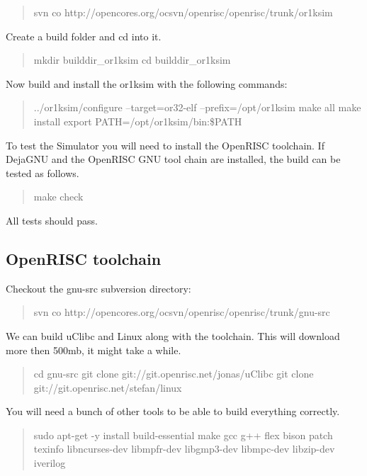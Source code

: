 \documentclass[10pt,a4paper]{article}
\begin{document}
\begin{quote}
svn co http://opencores.org/ocsvn/openrisc/openrisc/trunk/or1ksim
\end{quote}

Create a build folder and cd into it.
\begin{quote}
mkdir builddir\_or1ksim \newline
cd builddir\_or1ksim
\end{quote}

Now build and install the or1ksim with the following commands:
\begin{quote}
../or1ksim/configure --target=or32-elf --prefix=/opt/or1ksim \newline 
make all  \newline
make install \newline
export PATH=/opt/or1ksim/bin:\$PATH
\end{quote}
To test the Simulator you will need to install the OpenRISC toolchain.
If DejaGNU and the OpenRISC GNU tool chain are installed, the build can be tested as follows.

\begin{quote}
make check
\end{quote}

All tests should pass.
 	
\subsection{OpenRISC toolchain}
Checkout the gnu-src subversion directory:

\begin{quote}
svn co http://opencores.org/ocsvn/openrisc/openrisc/trunk/gnu-src
\end{quote}

We can build uClibc and Linux along with the toolchain. This will download more then 500mb, it might take a while.

\begin{quote}
cd gnu-src \newline
git clone git://git.openrisc.net/jonas/uClibc \newline
git clone git://git.openrisc.net/stefan/linux
\end{quote}

You will need a bunch of other tools to be able to build everything correctly.

\begin{quote}
sudo apt-get -y install build-essential make gcc g++ flex bison patch texinfo libncurses-dev libmpfr-dev libgmp3-dev libmpc-dev libzip-dev iverilog
\end{quote}
\end{document}
